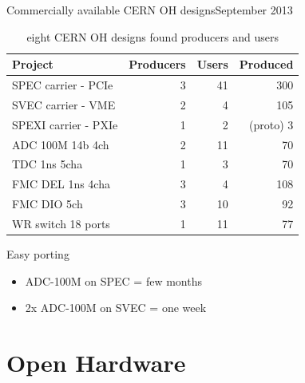 \documentclass[compress,red]{beamer}
\begin{document}
\begin{frame}{Commercially available CERN OH designs}{September 2013}
\begin{table}
\centering

\begin{tabular}{|l||r|r|r|}  
\hline
Project & Producers & Users & Produced\\
\hline\hline
SPEC carrier - PCIe & 3 & 41 & 300 \\  
\hline
SVEC carrier - VME & 2 & 4 & 105 \\
\hline
SPEXI carrier - PXIe & 1 & 2 & (proto) 3 \\  
\hline
\hline
ADC 100M 14b 4ch & 2 & 11 & 70 \\
\hline
TDC 1ns 5cha & 1 & 3 & 70 \\
\hline
FMC DEL 1ns 4cha & 3 & 4 & 108 \\
\hline
FMC DIO 5ch & 3 & 10 & 92 \\
\hline
WR switch 18 ports & 1 & 11 & 77 \\
\hline
\end{tabular}

\caption{eight CERN OH designs found producers and users}




\begin{frame}{Easy porting}

  \begin{block}{}
    \begin{itemize}
    \item
      ADC-100M on SPEC = few months
    \item
      2x ADC-100M on SVEC = one week
    \end{itemize}
  \end{block}

\end{frame}


\section{Open Hardware}


\end{table}
\end{frame}
\end{document}
